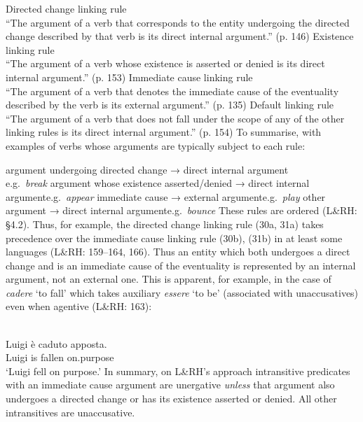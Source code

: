 \documentclass[output=paper]{langsci/langscibook}
\begin{document}
\ea
    \ea Directed change linking rule\\ \enquote{The argument of a verb that corresponds to the entity undergoing the directed change described by that verb is its direct internal argument.} (p. 146)
    \ex Existence linking rule\\ \enquote{The argument of a verb whose existence is asserted or denied is its direct internal argument.} (p. 153)
    \ex Immediate cause linking rule\\ \enquote{The argument of a verb that denotes the immediate cause of the eventuality described by the verb is its external argument.} (p. 135)
    \ex Default linking rule\\ \enquote{The argument of a verb that does not fall under the scope of any of the other linking rules is its direct internal argument.} (p. 154)
    \z
\z
To summarise, with examples of verbs whose arguments are typically subject to
each rule:

\ea
    \ea argument undergoing directed change → direct internal argument\\\hfill e.g.\ \emph{break}
    \ex argument whose existence asserted/denied → direct internal argument\hfill e.g.\ \emph{appear}
    \ex immediate cause → external argument\hfill e.g.\ \emph{play}
    \ex other argument → direct internal argument\hfill e.g.\ \emph{bounce}
    \z
\z
These rules are ordered (L\&RH: §4.2). Thus, for example, the directed change
linking rule (30a, 31a) takes precedence over the immediate cause linking rule
(30b), (31b) in at least some languages (L\&RH: 159–164, 166). Thus an entity
which both undergoes a direct change and is an immediate cause of the
eventuality is represented by an internal argument, not an external one. This
is apparent, for example, in the case of  \emph{cadere} \enquote*{to
fall} which takes auxiliary \emph{essere} \enquote*{to be} (associated with
unaccusatives) even when agentive (L\&RH: 163):

\ea {}\\
    \gll Luigi   è   caduto   apposta.\\
        Luigi   is   fallen   on.purpose\\
    \glt \enquote*{Luigi fell on purpose.}
\z
In summary, on L\&RH’s approach intransitive predicates with an immediate cause
argument are unergative \emph{unless} that argument also undergoes a directed
change or has its existence asserted or denied. All other intransitives are
unaccusative.
\end{document}
